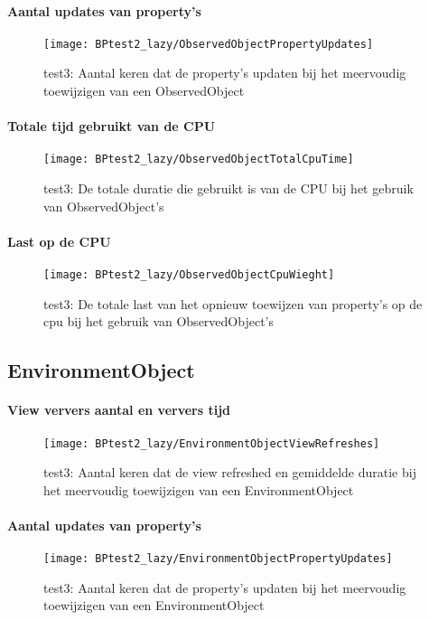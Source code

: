 \paragraph{Aantal updates van property's}
\begin{figure}[H]
    \centering
    \texttt{[image: BPtest2\_lazy/ObservedObjectPropertyUpdates]} 
    \caption{test3: Aantal keren dat de property's updaten bij het meervoudig toewijzigen van een ObservedObject}
    \label{fig:propertyUpdatesObservedObject2}
\end{figure}
\paragraph{Totale tijd gebruikt van de CPU}
\begin{figure}[H]
    \centering
    \texttt{[image: BPtest2\_lazy/ObservedObjectTotalCpuTime]} 
    \caption{test3: De totale duratie die gebruikt is van de CPU bij het gebruik van ObservedObject's}
    \label{fig:cpuUsageTimeObservedObject2}
\end{figure}
\paragraph{Last op de CPU}
\begin{figure}[H]
    \centering
    \texttt{[image: BPtest2\_lazy/ObservedObjectCpuWieght]} 
    \caption{test3: De totale last van het opnieuw toewijzen van property's op de cpu bij het gebruik van ObservedObject's}
    \label{fig:cpuWeightObservedObject2}
\end{figure}

\subsection{EnvironmentObject}
\paragraph{View ververs aantal en ververs tijd}
\begin{figure}[H]
    \centering
    \texttt{[image: BPtest2\_lazy/EnvironmentObjectViewRefreshes]} 
    \caption{test3: Aantal keren dat de view refreshed en gemiddelde duratie bij het meervoudig toewijzigen van een EnvironmentObject}
    \label{fig:viewRefreshesEnvironmentObject2}
\end{figure}
\paragraph{Aantal updates van property's}
\begin{figure}[H]
    \centering
    \texttt{[image: BPtest2\_lazy/EnvironmentObjectPropertyUpdates]} 
    \caption{test3: Aantal keren dat de property's updaten bij het meervoudig toewijzigen van een EnvironmentObject}
    \label{fig:propertyUpdatesEnvironmentObject2}
\end{figure}
